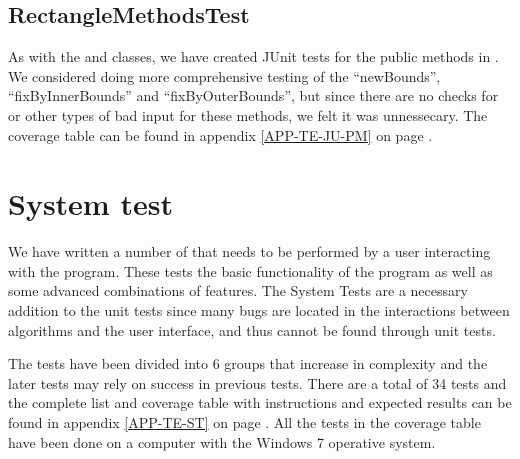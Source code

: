 \subsection{RectangleMethodsTest}
\label{TEST-JU-RMT}
As with the  and  classes, we have created
JUnit tests for the public methods in . We considered
doing more comprehensive testing of the ``newBounds'', ``fixByInnerBounds'' and
``fixByOuterBounds'', but since there are no checks for  or other
types of bad input for these methods, we felt it was unnessecary. The coverage
table can be found in appendix \ref{APP-TE-JU-PM} on page
\pageref{APP-TE-JU-PM}.

\section{System test}
\label{TEST-ST}
We have written a number of  that needs to be performed by a
user interacting with the program. These tests the basic functionality of the
program as well as some advanced combinations of features. The System Tests are
a necessary addition to the unit tests since many bugs are located in the
interactions between algorithms and the user interface, and thus cannot be found
through unit tests. 

The tests have been divided into 6 groups that increase in
complexity and the later tests may rely on success in previous tests. There are
a total of 34 tests and the complete list and coverage table with instructions
and expected results can be found in appendix \ref{APP-TE-ST} on page
\pageref{APP-TE-ST}. All the tests in the coverage table have been done on a
computer with the Windows 7 operative system.
